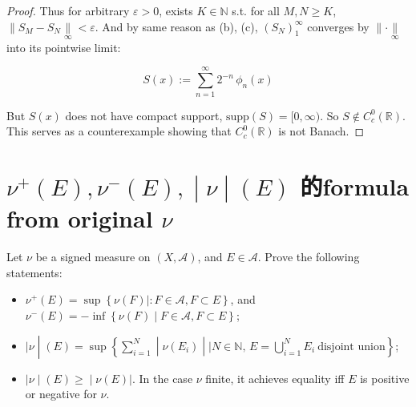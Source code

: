 \documentclass{qlnotes-export}
\begin{document}
\begin{proof}
Thus for arbitrary \(\varepsilon > 0\), exists \(K \in {\mathbb{N}}\) s.t. for all \(M,N \geq K\), \(\parallel S_{M} - S_{N}\underset{\infty}{\parallel} < \varepsilon\). And by same reason as (b), (c), \((S_{N})_{1}^{\infty}\) converges by \(\parallel \cdot \underset{\infty}{\parallel}\) into its pointwise limit:

\[S(x) := \sum\limits_{n = 1}^{\infty}2^{- n}\,\phi_{n}(x)\]

But \(S(x)\) does not have compact support, \(\text{supp}(S) = \lbrack 0,\infty)\). So \(S \notin C_{c}^{0}({\mathbb{R}})\). This serves as a counterexample showing that \(C_{c}^{0}({\mathbb{R}})\) is not Banach.

\end{proof}

\section{\texorpdfstring{\(\left. \nu^{+}(E),\nu^{-}(E), \middle| \nu \middle| (E) \right.\) 的formula from original \(\nu\)}{\textbackslash left. \textbackslash nu\^{}\{+\}(E),\textbackslash nu\^{}\{-\}(E), \textbackslash middle\textbar{} \textbackslash nu \textbackslash middle\textbar{} (E) \textbackslash right. 的formula from original \textbackslash nu}}\label{nue-nu-enue-ux7684formula-from-original-nu}

Let \(\nu\) be a signed measure on \((X,\mathcal{A})\), and \(E \in \mathcal{A}\). Prove the following statements:

\begin{itemize}
\item
  \(\nu^{+}(E) = \sup\left\{ {\nu(F) \mid :F \in \mathcal{A},F \subset E} \right\}\), and \(\nu^{-}(E) = - \inf\left\{ {\nu(F) \mid F \in \mathcal{A},F \subset E} \right\}\);
\item
  \(\left. |\nu \middle| (E) = \sup\left\{ \sum_{i = 1}^{N} \middle| \nu(E_{i}) \middle| \mid N \in {\mathbb{N}},\, E = \bigcup_{i = 1}^{N}E_{i}\ \text{disjoint union} \right\} \right.\);
\item
  \(\left. |\nu \middle| (E) \geq \middle| \nu(E)| \right.\). In the case \(\nu\) finite, it achieves equality iff \(E\) is positive or negative for \(\nu\).
\end{itemize}
\end{document}
